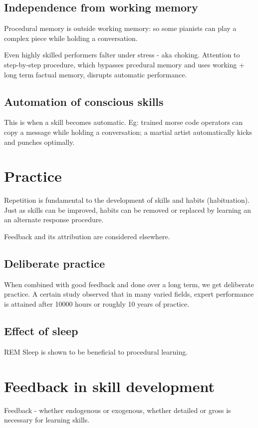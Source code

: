 \documentclass[oneside, article]{memoir}
\begin{document}
\subsection{Independence from working memory}
Procedural memory is outside working memory: so some pianists can play a complex piece while holding a conversation.

Even highly skilled performers falter under stress - aka choking. Attention to step-by-step procedure, which bypasses prcedural memory and uses working + long term factual memory, disrupts automatic performance.

\subsection{Automation of conscious skills}
This is when a skill becomes automatic. Eg: trained morse code operators can copy a message while holding a conversation; a martial artist automatically kicks and punches optimally.

\section{Practice}
Repetition is fundamental to the development of skills and habits (habituation). Just as skills can be improved, habits can be removed or replaced by learning an an alternate response procedure.

Feedback and its attribution are considered elsewhere.

\subsection{Deliberate practice}
When combined with good feedback and done over a long term, we get deliberate practice. A certain study observed that in many varied fields, expert performance is attained after 10000 hours or roughly 10 years of practice.

\subsection{Effect of sleep}
REM Sleep is shown to be beneficial to procedural learning.

\section{Feedback in skill development}
Feedback - whether endogenous or exogenous, whether detailed or gross is necessary for learning skills.
\end{document}
